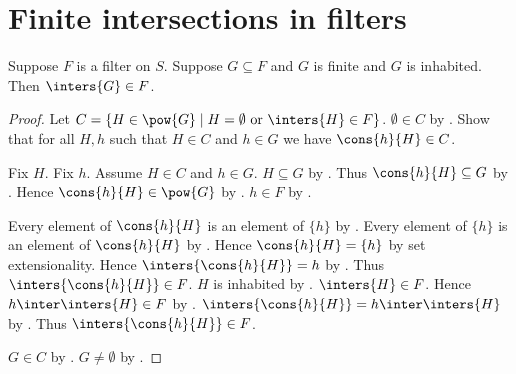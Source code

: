 \section{Finite intersections in filters}




\begin{proposition}\label{filter_inhabited_finite_intersection_in}
    Suppose $F$ is a filter on $S$.
    Suppose $G\subseteq F$ and $G$ is finite and $G$ is inhabited.
    Then $\inters{G}\in F$.
\end{proposition}
\begin{proof}
    Let $C=\{H\in\pow{G}\mid
        \text{$H=\emptyset$ or $\inters{H}\in F$}\}$.
    $\emptyset\in C$ by .
    Show that for all $H,h$ such that $H\in C$ and $h\in G$ we have
        $\cons{h}{H}\in C$.
    \begin{subproof}
        Fix $H$.
        Fix $h$.
        Assume $H\in C$ and $h\in G$.
        $H\subseteq G$ by .
        Thus $\cons{h}{H}\subseteq G$ by .
        Hence $\cons{h}{H}\in\pow{G}$ by .
        $h\in F$ by .
        \begin{byCase}
            Every element of $\cons{h}{H}$ is an element of $\{h\}$
                by .
            Every element of $\{h\}$ is an element of $\cons{h}{H}$
                by .
            Hence $\cons{h}{H}=\{h\}$ by set extensionality.
            Hence $\inters{\cons{h}{H}}=h$
                by .
            Thus $\inters{\cons{h}{H}}\in F$.
            $H$ is inhabited by .
            $\inters{H}\in F$.
            Hence $h\inter\inters{H}\in F$ by .
            $\inters{\cons{h}{H}}=h\inter\inters{H}$
                by .
            Thus $\inters{\cons{h}{H}}\in F$.
        \end{byCase}
    \end{subproof}
    $G\in C$ by .
    $G\neq\emptyset$ by .
\end{proof}

